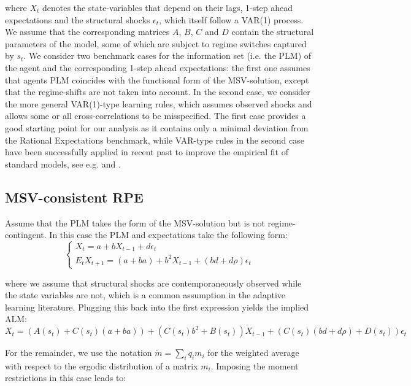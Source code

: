 \documentclass[12pt,reqno]{article}
\numberwithin{equation}{section}
\begin{document}
where $X_t $ denotes the state-variables that depend on their lags, 1-step ahead expectations and the structural shocks $\epsilon_t$, which itself follow a VAR(1) process. We assume that the corresponding matrices $A$, $B$, $C$ and $D$ contain the structural parameters of the model, some of which are subject to regime switches captured by $s_t$.  We consider two benchmark cases for the information set (i.e. the PLM) of the agent and the corresponding 1-step ahead expectations: the first one assumes that agents PLM coincides with the functional form of the MSV-solution, except that the regime-shifts are not taken into account. In the second case, we consider the more general VAR(1)-type learning rules, which assumes observed shocks and allows some or all cross-correlations to be misspecified.  The first case provides a good starting point for our analysis as it contains only a minimal deviation from the Rational Expectations benchmark, while VAR-type rules in the second case have been successfully applied in recent past to improve the empirical fit of standard models, see e.g. \cite{slobodyan2012alearning} and \cite{christopher2018learning}. 

\subsection{MSV-consistent RPE} 

Assume that the PLM takes the form of the MSV-solution but is not regime-contingent. In this case the PLM and expectations take the following form: \\

$$
\begin{cases}
X_t = a + b X_{t-1} + d \epsilon_t \\
E_t X_{t+1} = (a+ba) + b^2 X_{t-1} + (bd + d\rho) \epsilon_t 
\end{cases}
$$

where we assume that structural shocks are contemporaneously observed while the state variables are not, which is a common assumption in the adaptive learning literature. Plugging this back into the first expression yields the implied ALM: 
$$
X_t = ( A(s_t) + C(s_t) (a+ba) ) + (C(s_t) b^2 + B(s_t))X_{t-1} + ( C(s_t) (bd +d \rho ) + D(s_t) ) \epsilon_t 
$$

For the remainder, we use the notation $\tilde{m} = \sum_i q_i m_i $ for the weighted average with respect to the ergodic distribution of a matrix $m_i $. Imposing the moment restrictions in this case leads to: 
\end{document}
